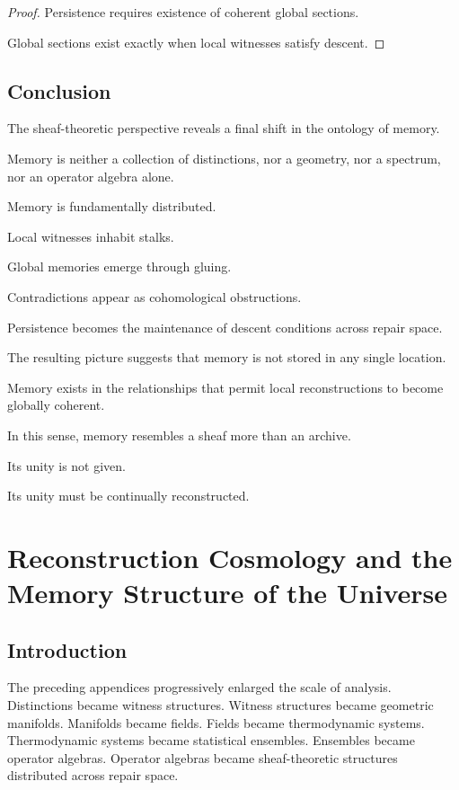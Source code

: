 \documentclass[12pt,oneside]{book}
\theoremstyle{plain} \newtheorem{theorem}{Theorem}[chapter] \newtheorem{lemma}[theorem]{Lemma} \newtheorem{proposition}[theorem]{Proposition} \newtheorem{corollary}[theorem]{Corollary}
\theoremstyle{definition} \newtheorem{definition}[theorem]{Definition} \newtheorem{axiom}[theorem]{Axiom} \newtheorem{construction}[theorem]{Construction}
\theoremstyle{remark} \newtheorem{remark}[theorem]{Remark} \newtheorem{example}[theorem]{Example}
\begin{document}
\begin{proof}

Persistence requires existence of coherent global sections.

Global sections exist exactly when local witnesses satisfy descent.

\end{proof}

\section{Conclusion}

The sheaf-theoretic perspective reveals a final shift in the ontology of memory.

Memory is neither a collection of distinctions, nor a geometry, nor a spectrum, nor an operator algebra alone.

Memory is fundamentally distributed.

Local witnesses inhabit stalks.

Global memories emerge through gluing.

Contradictions appear as cohomological obstructions.

Persistence becomes the maintenance of descent conditions across repair space.

The resulting picture suggests that memory is not stored in any single location.

Memory exists in the relationships that permit local reconstructions to become globally coherent.

In this sense, memory resembles a sheaf more than an archive.

Its unity is not given.

Its unity must be continually reconstructed.

\chapter{Reconstruction Cosmology and the Memory Structure of the Universe}

\section{Introduction}

The preceding appendices progressively enlarged the scale of analysis. Distinctions became witness structures. Witness structures became geometric manifolds. Manifolds became fields. Fields became thermodynamic systems. Thermodynamic systems became statistical ensembles. Ensembles became operator algebras. Operator algebras became sheaf-theoretic structures distributed across repair space.
\end{document}
